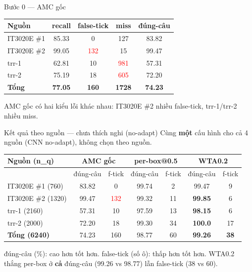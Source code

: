 \documentclass{beamer}
\newcommand{\hl}[1]{\textbf{#1}}
\begin{document}
\begin{frame}{Bước 0 --- AMC gốc}
\footnotesize
\begin{center}
\begin{tabular}{|l|c|c|c|c|}
\hline
\textbf{Nguồn} & \textbf{recall} & \textbf{false-tick} & \textbf{miss} & \textbf{đúng-câu} \\
\hline
IT3020E \#1 & 85.33 & 0 & 127 & 83.82 \\
\hline
IT3020E \#2 & 99.05 & \textcolor{red}{132} & 15 & 99.47 \\
\hline
trr-1 & 62.81 & 10 & \textcolor{red}{981} & 57.31 \\
\hline
trr-2 & 75.19 & 18 & \textcolor{red}{605} & 72.20 \\
\hline
\hl{Tổng} & \hl{77.05} & \hl{160} & \hl{1728} & \hl{74.23} \\
\hline
\end{tabular}
\end{center}
\vspace{0.2cm}
{\scriptsize AMC gốc có hai kiểu lỗi khác nhau: IT3020E \#2 nhiều false-tick, trr-1/trr-2 nhiều miss.}
\end{frame}

\begin{frame}{Kết quả theo nguồn --- chưa thích nghi (no-adapt)}
\footnotesize
Cùng \hl{một} cấu hình cho cả 4 nguồn (CNN no-adapt), không chọn theo nguồn.
\begin{center}
\begin{tabular}{|l|c|c|c|c|c|c|}
\hline
\textbf{Nguồn (n\_q)} &
\multicolumn{2}{c|}{\textbf{AMC gốc}} &
\multicolumn{2}{c|}{\textbf{per-box@0.5}} &
\multicolumn{2}{c|}{\textbf{WTA0.2}} \\
\hline
 & đúng-câu & f-tick & đúng-câu & f-tick & đúng-câu & f-tick \\
\hline
IT3020E \#1 (760) & 83.82 & 0 & 99.74 & 2 & 99.47 & 9 \\
\hline
IT3020E \#2 (1320) & 99.47 & \textcolor{red}{132} & 99.32 & 11 & \hl{99.85} & 6 \\
\hline
trr-1 (2160) & 57.31 & 10 & 97.59 & 13 & \hl{98.15} & 6 \\
\hline
trr-2 (2000) & 72.20 & 18 & 99.30 & 34 & \hl{100.0} & 17 \\
\hline
\hl{Tổng (6240)} & 74.23 & 160 & 98.77 & 60 & \hl{99.26} & \hl{38} \\
\hline
\end{tabular}
\end{center}
\vspace{0.1cm}
{\scriptsize đúng-câu (\%): cao hơn tốt hơn. false-tick (số ô): thấp hơn tốt hơn. WTA0.2 thắng per-box ở \hl{cả} đúng-câu (99.26 vs 98.77) lẫn false-tick (38 vs 60).}
\end{frame}
\end{document}
